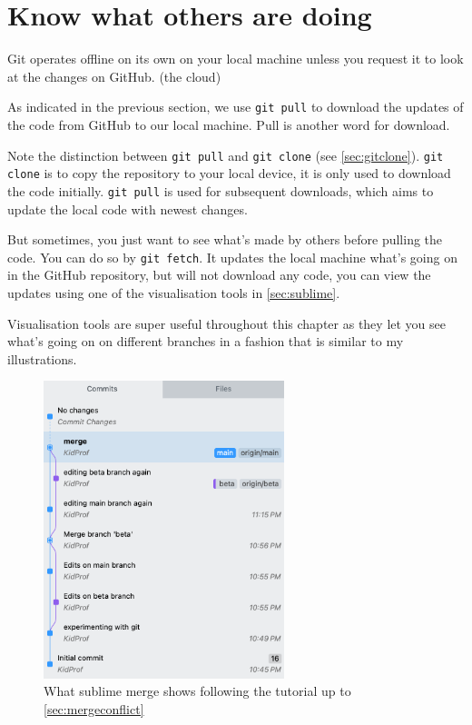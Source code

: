 \section{Know what others are doing}
\label{sec:gitpull}

Git operates offline on its own on your local machine unless you request it to look at the changes on GitHub. (the cloud) 

As indicated in the previous section, we use \texttt{git pull} to download the updates of the code from GitHub to our local machine. Pull is another word for download.

Note the distinction between \texttt{git pull} and \texttt{git clone} (see \cref{sec:gitclone}). \texttt{git clone} is to copy the repository to your local device, it is only used to download the code initially. \texttt{git pull} is used for subsequent downloads, which aims to update the local code with newest changes.

But sometimes, you just want to see what's made by others before pulling the code. You can do so by \texttt{git fetch}. It updates the local machine what's going on in the GitHub repository, but will not download any code, you can view the updates using one of the visualisation tools in \cref{sec:sublime}.

Visualisation tools are super useful throughout this chapter as they let you see what's going on on different branches in a fashion that is similar to my illustrations.

\begin{figure}[h]
\centering
\includegraphics[width=7cm]{images/ch8-sublimemerge.png}
\caption{What sublime merge shows following the tutorial up to \cref{sec:mergeconflict}}
\end{figure}

